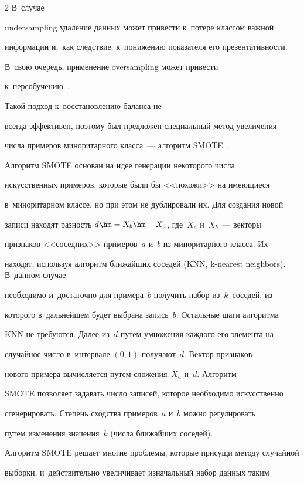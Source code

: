 \begin{multicols}{2}
В~случае 

undersampling удаление данных может привести к~потере классом важной 

информации и,~как следствие, к~понижению показателя его презентативности. 

В~свою очередь, применение oversampling может привести 

к~переобучению~\cite{3-sev}. 



Такой подход к~восстановлению баланса не 

всегда эффективен, поэтому был предложен специальный метод увеличения 

числа примеров миноритарного класса~--- алгоритм SMOTE~\cite{5-sev}.

  

  Алгоритм SMOTE основан на идее генерации некоторого числа 

искусственных примеров, которые были бы <<похожи>> на имеющиеся 

в~миноритарном классе, но при этом не дублировали их. Для создания новой 

записи находят разность  $d\hm= X_b\hm-X_a$, где~$X_a$ и~$X_b$~--- векторы 

признаков <<соседних>> примеров~$a$ и~$b$ из миноритарного класса. Их 

находят, используя алгоритм ближайших соседей (KNN, k-nearest neighbors). В~данном случае 

необходимо и~достаточно для примера~$b$ получить набор из~$k$~соседей, из 

которого в~дальнейшем будет выбрана запись~$b$. Остальные шаги алгоритма 

KNN не требуются. Далее из~$d$ путем умножения каждого его элемента на 

случайное число в~интервале $(0, 1)$ получают~$\tilde{d}$. Вектор признаков 

нового примера вычисляется путем сложения~$X_a$ и~$\tilde{d}$. Алгоритм 

SMOTE позволяет задавать число записей, которое необходимо искусственно 

сгенерировать. Степень сходства примеров~$a$ и~$b$ можно регулировать 

путем изменения значения~$k$ (числа ближайших соседей). 

  

 Алгоритм SMOTE решает многие проблемы, которые присущи методу случайной 

выборки, и~действительно увеличивает изначальный набор данных таким 


\end{multicols}
